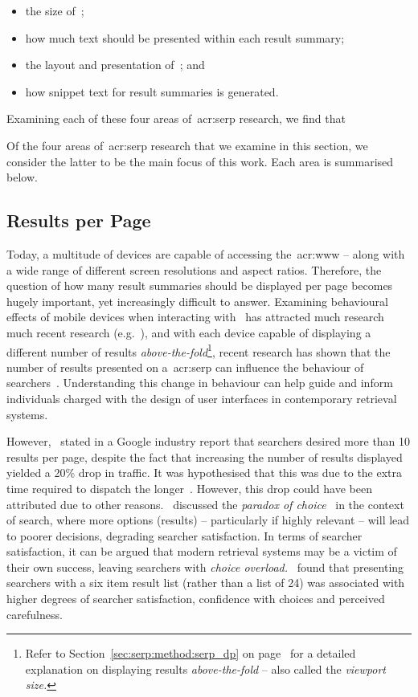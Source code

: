 \begin{itemize}
    \item{the size of~;}
    \item{how much text should be presented within each result summary;}
    \item{the layout and presentation of~; and}
    \item{how snippet text for result summaries is generated.}
\end{itemize}

Examining each of these four areas of~\gls{acr:serp} research, we find that 

Of the four areas of~\gls{acr:serp} research that we examine in this section, we consider the latter to be the main focus of this work. Each area is summarised below.

\subsection{Results per Page}
Today, a multitude of devices are capable of accessing the~\gls{acr:www} -- along with a wide range of different screen resolutions and aspect ratios. Therefore, the question of how many result summaries should be displayed per page becomes hugely important, yet increasingly difficult to answer. Examining behavioural effects of mobile devices when interacting with~ has attracted much research much recent research (e.g.~\cite{kim2012small_vs_large, kim2014eye_tracking, kim2016pagination_versus_scrolling}), and with each device capable of displaying a different number of results \emph{above-the-fold}\footnote{Refer to Section~\ref{sec:serp:method:serp_dp} on page~\pageref{sec:serp:method:serp_dp} for a detailed explanation on displaying results \emph{above-the-fold} -- also called the \emph{viewport size.}}, recent research has shown that the number of results presented on a~\gls{acr:serp} can influence the behaviour of searchers~\citep{joachims2005click_model, kim2014eye_tracking}. Understanding this change in behaviour can help guide and inform individuals charged with the design of user interfaces in contemporary retrieval systems.

However,~\cite{linden2006} stated in a Google industry report that searchers desired more than 10 results per page, despite the fact that increasing the number of results displayed yielded a 20\% drop in traffic. It was hypothesised that this was due to the extra time required to dispatch the longer~. However, this drop could have been attributed due to other reasons.~\cite{oulasvirta2009serp_size} discussed the \emph{paradox of choice}~\citep{schwartz2005paradox_of_choice} in the context of search, where more options (results) -- particularly if highly relevant -- will lead to poorer decisions, degrading searcher satisfaction. In terms of searcher satisfaction, it can be argued that modern retrieval systems may be a victim of their own success, leaving searchers with \emph{choice overload.}~\cite{oulasvirta2009serp_size} found that presenting searchers with a six item result list (rather than a list of 24) was associated with higher degrees of searcher satisfaction, confidence with choices and perceived carefulness.

